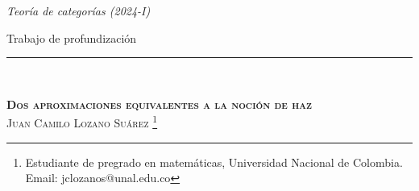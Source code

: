 \normalsize{
    \noindent\textit{Teoría de categorías (2024-I)}

    \vspace{-0.1cm}
    \noindent Trabajo de profundización
    
    \vspace{-0.2cm}
}
\noindent\rule{10cm}{0.1pt}\\
\vspace{0.5cm}
\begin{center}
   \textsc{
      \Large{\textbf{Dos aproximaciones equivalentes a la noción de haz}}
   }\\ \vspace{0.7cm}
   \large{\textsc{Juan Camilo Lozano Suárez \footnote{Estudiante de pregrado en matemáticas, Universidad Nacional de Colombia.\\Email: jclozanos@unal.edu.co}}}\\ \vspace{0.5cm}
\end{center}
\hspace{3.5cm} \hrulefill \hspace{3.5cm}
